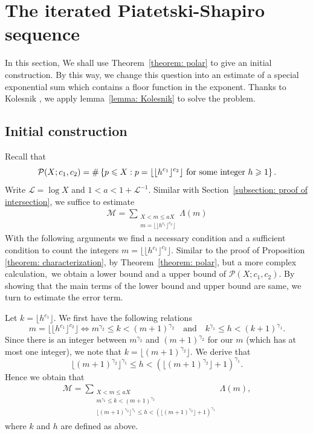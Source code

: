 \documentclass[12pt, reqno, twoside, letterpaper]{amsart}
\numberwithin{equation}{section}
\newcommand{\cL}{\ensuremath{\mathcal{L}}}
\newcommand{\cM}{\ensuremath{\mathcal{M}}}
\newcommand{\cP}{\ensuremath{\mathcal{P}}}
\theoremstyle{customthm}
\theoremstyle{customrem}
\begin{document}
\section{The iterated Piatetski-Shapiro sequence}
\label{section: proof 3}
In this section, We shall use Theorem~\ref{theorem: polar} to give an initial construction. By this way, we change this question into an estimate of a special exponential sum which contains a floor function in the exponent. Thanks to Kolesnik \cite{Kolesnik2003}, we apply lemma~\ref{lemma: Kolesnik} to solve the problem.

\subsection{Initial construction}

Recall that
$$
\cP(X; c_1,c_2) = \#\left\{p\leqslant X: p=\lfloor\lfloor h^{c_1}\rfloor ^{c_2}\rfloor
\ \hbox{for some integer}\ h\geqslant 1\right\}.
$$
Write $\cL = \log X$ and $1<a<1+\cL^{-1}$. Similar with Section~\ref{subsection: proof of intersection}, we suffice to estimate
\begin{align}
\cM =\sum_{\substack{X < m \leqslant aX \\ m=\lfloor\lfloor h^{c_1}\rfloor ^{c_2}\rfloor }}\Lambda(m)
\end{align}
With the following arguments we find a necessary condition and a sufficient condition to count the integers $m=\lfloor\lfloor h^{c_1}\rfloor ^{c_2}\rfloor$. Similar to the proof of Proposition \ref{theorem: characterization}, by Theorem~\ref{theorem: polar}, but a more complex calculation,\ we obtain a lower bound and a upper bound of
$\cP(X; c_1,c_2)$. By showing that the main terms of the lower bound and upper bound are same, we turn to estimate the error term.

Let $k=\lfloor h^{c_1}\rfloor$. We first have the following relations
$$
m=\lfloor\lfloor h^{c_1}\rfloor ^{c_2}\rfloor \Leftrightarrow m^{\gamma_2} \leqslant k < (m+1)^{\gamma_2} \quad \text{and} \quad k^{\gamma_1} \leqslant h < (k+1)^{\gamma_1}.
$$
Since there is an integer between $m^{\gamma_2}$ and $(m+1)^{\gamma_2}$ for our $m$ (which has at most one integer), we note that $k = \lfloor (m+1)^{\gamma_2}\rfloor$. We derive that
$$
\lfloor (m+1)^{\gamma_2}\rfloor^{\gamma_1} \leqslant h < (\lfloor (m+1)^{\gamma_2}\rfloor+1)^{\gamma_1}.
$$
Hence we obtain that
\begin{align}
	\label{7.1.1}
\cM = \sum_{\substack{X < m \leqslant aX \\ m^{\gamma_2} \leqslant k < (m+1)^{\gamma_2} \\ \lfloor (m+1)^{\gamma_2}\rfloor^{\gamma_1} \leqslant h < (\lfloor (m+1)^{\gamma_2}\rfloor+1)^{\gamma_1}}}\Lambda(m),
\end{align}
where $k$ and $h$ are defined as above.
\end{document}
